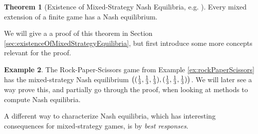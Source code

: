 \documentclass[a4paper,DIV=11,abstracton,twoside=semi]{scrreprt}
\theoremstyle{definition}
\newtheorem{thm}{Theorem}[chapter] %
\newtheorem{ex}[thm]{Example} %
\begin{document}
    \begin{thm}[Existence of Mixed-Strategy Nash Equilibria, e.g. {\cite[Section 1.3.1]{bib:fudenbergGameTheory}}]
        Every mixed extension of a finite game has a Nash equilibrium.
        \label{thm:existenceOfMixedStrategyEquilibria}
    \end{thm}
    We will give a a proof of this theorem in Section \ref{sec:existenceOfMixedStrategyEquilibria}, but first introduce some more concepts relevant for the proof.
    
    \begin{ex}
        The Rock-Paper-Scissors game from Example \ref{ex:rockPaperScissors}
        has the mixed-strategy Nash equilibrium $\bigl((\frac{1}{3}, \frac{1}{3}, \frac{1}{3}), (\frac{1}{3}, \frac{1}{3}, \frac{1}{3})\bigr)$.
        We will later see a way prove this, and partially go through the proof, when looking at methods to compute Nash equilibria.
    \end{ex}
    
    A different way to characterize Nash equilibria, which has interesting consequences for mixed-strategy games, is by \emph{best responses}.
    
\end{document}
